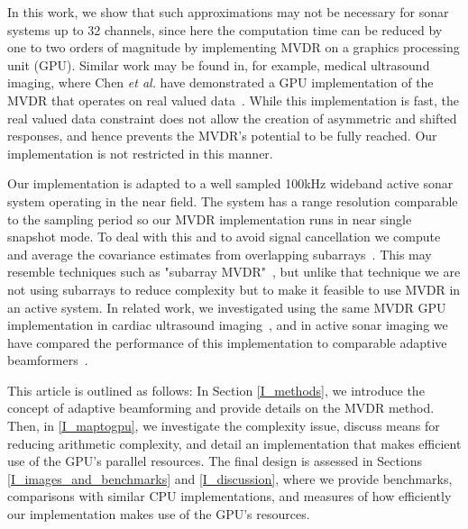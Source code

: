 % 
% 


In this work, we show that such approximations may not be necessary for sonar systems up to 32 channels, since here the computation time can be reduced by one to two orders of magnitude by implementing MVDR on a graphics processing unit (GPU). Similar work may be found in, for example, medical ultrasound imaging, where Chen \emph{et al.} have demonstrated a GPU implementation of the MVDR that operates on real valued data~\cite{Chen2011,Chen2011a}. While this implementation is fast, the real valued data constraint does not allow the creation of asymmetric and shifted responses, and hence prevents the MVDR's potential to be fully reached. Our implementation is not restricted in this manner.

Our implementation is adapted to a well sampled 100\;kHz wideband active sonar system operating in the near field. The system has a range resolution comparable to the sampling period so our MVDR implementation runs in near single snapshot mode. To deal with this and to avoid signal cancellation we compute and average the covariance estimates from overlapping subarrays~\cite{Kailath1985}. This may resemble techniques such as "subarray MVDR"~\cite{Chapman1976}, but unlike that technique we are not using subarrays to reduce complexity but to make it feasible to use MVDR in an active system. In related work, we investigated using the same MVDR GPU implementation in cardiac ultrasound imaging~\cite{Asen2012,Asen2013}, and in active sonar imaging we have compared the performance of this implementation to comparable adaptive beamformers~\cite{Buskenes2013}.

This article is outlined as follows: In Section \ref{I_methods}, we introduce the concept of adaptive beamforming and provide details on the MVDR method. Then, in \ref{I_maptogpu}, we investigate the complexity issue, discuss means for reducing arithmetic complexity, and detail an implementation that makes efficient use of the GPU's parallel resources. The final design is assessed in Sections \ref{I_images_and_benchmarks} and \ref{I_discussion}, where we provide benchmarks, comparisons with similar CPU implementations, and measures of how efficiently our implementation makes use of the GPU's resources.

